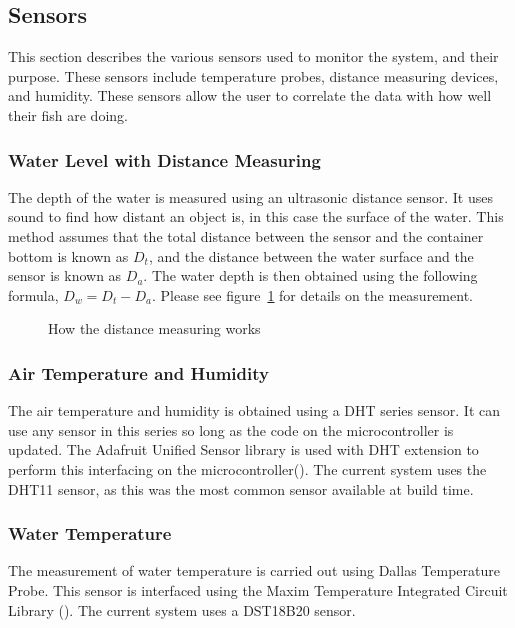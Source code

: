 \documentclass[american,man,12pt]{apa6}
\begin{document}
\subsection{Sensors}
This section describes the various sensors used to monitor the system, and their
purpose. These sensors include temperature probes, distance measuring devices,
and humidity. These sensors allow the user to correlate the data with how well
their fish are doing.

\subsubsection{Water Level with Distance Measuring}
The depth of the water is measured using an ultrasonic distance sensor. It uses
sound to find how distant an object is, in this case the surface of the water.
This method assumes that the total distance between the sensor and the container
bottom is known as $D_t$, and the distance between the water surface and the sensor
is known as $D_a$. The water depth is then obtained using the following formula,
$D_w = D_t - D_a$. Please see figure~\ref{fig:distance measuring} for details on the
measurement.

\begin{figure}[h]
	\centering
	\caption{How the distance measuring works}
	\label{fig:distance measuring}
\end{figure}

\subsubsection{Air Temperature and Humidity}
The air temperature and humidity is obtained using a DHT series sensor. It can
use any sensor in this series so long as the code on the microcontroller is
updated. The Adafruit Unified Sensor library is used with DHT extension to
perform this interfacing on the
microcontroller(\cite{adafruit-unified-sensor,adafruit-dht}). The current system
uses the DHT11 sensor, as this was the most common sensor available at build
time.

\subsubsection{Water Temperature}
The measurement of water temperature is carried out using Dallas Temperature
Probe. This sensor is interfaced using the Maxim Temperature Integrated Circuit
Library (\cite{gh-arduino-temperature}). The current system uses
a DST18B20 sensor.
\end{document}
